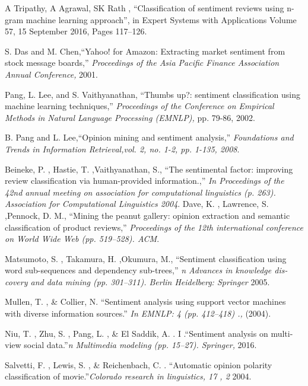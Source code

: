 \documentclass[10pt]{article}
\begin{document}
{\newpage


 \begin{thebibliography}{21}

 A Tripathy, A Agrawal, SK Rath , “Classification of sentiment reviews using 
n-gram machine learning approach”, in Expert Systems with Applications
Volume 57, 15 September 2016, Pages 117–126.

   S. Das and M. Chen,``Yahoo! for Amazon: Extracting market 
  sentiment from stock message boards,'' {\em Proceedings of the Asia Pacific 
  Finance Association Annual Conference,}  2001.

  
  
  Pang, L. Lee, and S. Vaithyanathan, ``Thumbs up?: sentiment 
  classification using machine learning techniques,'' {\em Proceedings of the 
  Conference on Empirical Methods in Natural Language Processing (EMNLP),}
  pp. 79-86, 2002.
  
  B. Pang and L. Lee,``Opinion mining and sentiment analysis,'' {\em Foundations
  and Trends in Information Retrieval,vol. 2, no. 1-2, pp. 1-135,
2008}.
  
  Beineke, P. , Hastie, T. ,Vaithyanathan, S., ``The sentimental factor: improving
review classification via human-provided information.,'' {\em In Proceedings of the 42nd
annual meeting on association for computational linguistics (p. 263). Association
for Computational Linguistics 2004}.
   Dave, K. , Lawrence, S. ,Pennock, D. M., ``Mining the peanut gallery: opinion
extraction and semantic classification of product reviews,'' {\em Proceedings of the
12th international conference on World Wide Web (pp. 519–528). ACM}.

  
   Matsumoto, S. , Takamura, H. ,Okumura, M., ``Sentiment classification using
word sub-sequences and dependency sub-trees,'' {\em n Advances in knowledge dis-
covery and data mining (pp. 301–311). Berlin Heidelberg: Springer} 2005.


   Mullen, T. , \& Collier, N.  ``Sentiment analysis using support vector machines
with diverse information sources.'' {\em  In EMNLP: 4 (pp. 412–418) .,} (2004).
  
  Niu, T. , Zhu, S. , Pang, L. , \& El Saddik, A. .  
  I .``Sentiment analysis on multi-view
social data.''{\em n Multimedia modeling (pp. 15–27). Springer,} 2016.
  
   Salvetti, F. , Lewis, S. , \& Reichenbach, C.  
   . ``Automatic opinion polarity classification of movie.''{\em Colorado research in linguistics, 17 , 2} 2004.


\end{thebibliography}}
\end{document}
